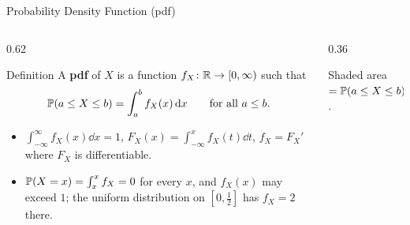 \begin{frame}{Probability Density Function (pdf)}
  \begin{columns}[T]
    \begin{column}{0.62\textwidth}
      \begin{block}{Definition}
        A \textbf{pdf} of $X$ is a function $f_X\colon\mathbb{R}\to[0,\infty)$ such that
        \[
          \mathbb{P}(a\le X\le b)=\int_a^b f_X(x)\,\mathrm{d} x\qquad\text{for all } a\le b .
        \]
      \end{block}
      \begin{itemize}
        \item $\int_{-\infty}^{\infty}f_X(x)\dd x=1$, \quad $F_X(x)=\int_{-\infty}^x f_X(t)\dd t$, \quad $f_X=F_X'$ where $F_X$ is differentiable.
        \item $\mathbb{P}(X=x)=\int_x^x f_X=0$ for every $x$, and $f_X(x)$ may exceed $1$; the uniform distribution on $[0,\tfrac12]$ has $f_X=2$ there.
      \end{itemize}
    \end{column}
    \begin{column}{0.36\textwidth}
      \centering
      \par\smallskip
      {\footnotesize Shaded area $=\mathbb{P}(a\le X\le b)$.}
    \end{column}
  \end{columns}
\end{frame}

